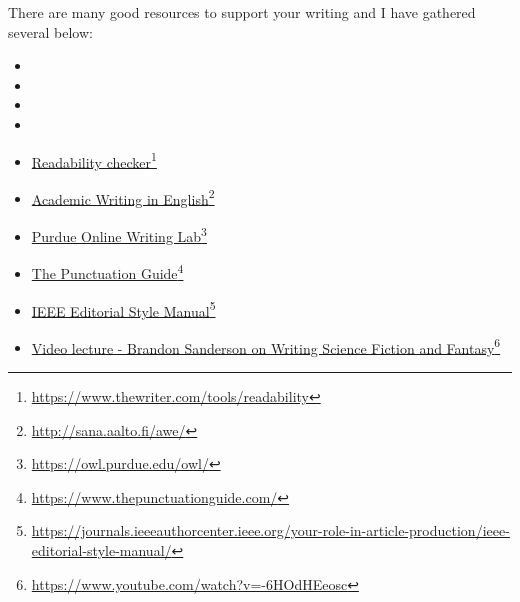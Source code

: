 There are many good resources to support your writing and I have gathered several below:

\begin{itemize}
    \item {}
    \item {}
    \item {}
    \item {}
    \item \href{https://www.thewriter.com/tools/readability}{Readability checker}\footnote{\url{https://www.thewriter.com/tools/readability}}
    \item \href{http://sana.aalto.fi/awe/}{Academic Writing in English}\footnote{\url{http://sana.aalto.fi/awe/}}
    \item \href{https://owl.purdue.edu/owl/}{Purdue Online Writing Lab}\footnote{\url{https://owl.purdue.edu/owl/}}
    \item \href{https://www.thepunctuationguide.com/}{The Punctuation Guide}\footnote{\url{https://www.thepunctuationguide.com/}}
    \item \href{https://journals.ieeeauthorcenter.ieee.org/your-role-in-article-production/ieee-editorial-style-manual/}{IEEE Editorial Style Manual}\footnote{\url{https://journals.ieeeauthorcenter.ieee.org/your-role-in-article-production/ieee-editorial-style-manual/}}
    \item \href{https://www.youtube.com/watch?v=-6HOdHEeosc}{Video lecture - Brandon Sanderson on Writing Science Fiction and Fantasy}\footnote{\url{https://www.youtube.com/watch?v=-6HOdHEeosc}}
\end{itemize}

